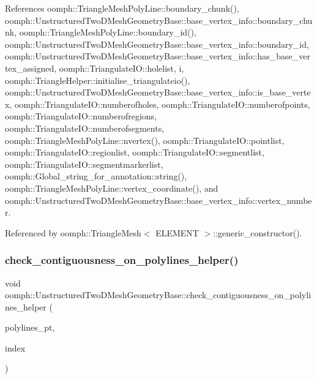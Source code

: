 References oomph\+::\+Triangle\+Mesh\+Poly\+Line\+::boundary\+\_\+chunk(), oomph\+::\+Unstructured\+Two\+D\+Mesh\+Geometry\+Base\+::base\+\_\+vertex\+\_\+info\+::boundary\+\_\+chunk, oomph\+::\+Triangle\+Mesh\+Poly\+Line\+::boundary\+\_\+id(), oomph\+::\+Unstructured\+Two\+D\+Mesh\+Geometry\+Base\+::base\+\_\+vertex\+\_\+info\+::boundary\+\_\+id, oomph\+::\+Unstructured\+Two\+D\+Mesh\+Geometry\+Base\+::base\+\_\+vertex\+\_\+info\+::has\+\_\+base\+\_\+vertex\+\_\+assigned, oomph\+::\+Triangulate\+I\+O\+::holelist, i, oomph\+::\+Triangle\+Helper\+::initialise\+\_\+triangulateio(), oomph\+::\+Unstructured\+Two\+D\+Mesh\+Geometry\+Base\+::base\+\_\+vertex\+\_\+info\+::is\+\_\+base\+\_\+vertex, oomph\+::\+Triangulate\+I\+O\+::numberofholes, oomph\+::\+Triangulate\+I\+O\+::numberofpoints, oomph\+::\+Triangulate\+I\+O\+::numberofregions, oomph\+::\+Triangulate\+I\+O\+::numberofsegments, oomph\+::\+Triangle\+Mesh\+Poly\+Line\+::nvertex(), oomph\+::\+Triangulate\+I\+O\+::pointlist, oomph\+::\+Triangulate\+I\+O\+::regionlist, oomph\+::\+Triangulate\+I\+O\+::segmentlist, oomph\+::\+Triangulate\+I\+O\+::segmentmarkerlist, oomph\+::\+Global\+\_\+string\+\_\+for\+\_\+annotation\+::string(), oomph\+::\+Triangle\+Mesh\+Poly\+Line\+::vertex\+\_\+coordinate(), and oomph\+::\+Unstructured\+Two\+D\+Mesh\+Geometry\+Base\+::base\+\_\+vertex\+\_\+info\+::vertex\+\_\+number.



Referenced by oomph\+::\+Triangle\+Mesh$<$ E\+L\+E\+M\+E\+N\+T $>$\+::generic\+\_\+constructor().

\mbox{\label{classoomph_1_1UnstructuredTwoDMeshGeometryBase_a0d709e87f038a60e3c8f8b84af412fa4}} 
\subsubsection{\texorpdfstring{check\+\_\+contiguousness\+\_\+on\+\_\+polylines\+\_\+helper()}{check\_contiguousness\_on\_polylines\_helper()}\hspace{0.1cm}{\footnotesize\ttfamily [1/2]}}
{\footnotesize\ttfamily void oomph\+::\+Unstructured\+Two\+D\+Mesh\+Geometry\+Base\+::check\+\_\+contiguousness\+\_\+on\+\_\+polylines\+\_\+helper (\begin{DoxyParamCaption}\item[{\hyperlink{classoomph_1_1Vector}{Vector}$<$ \hyperlink{classoomph_1_1TriangleMeshPolyLine}{Triangle\+Mesh\+Poly\+Line} $\ast$ $>$ \&}]{polylines\+\_\+pt,  }\item[{unsigned \&}]{index }\end{DoxyParamCaption})}



